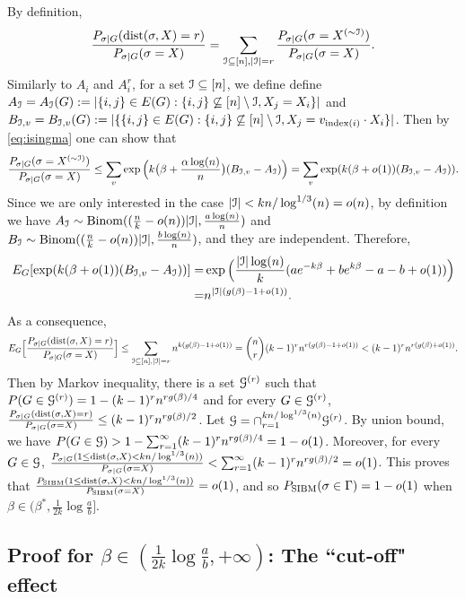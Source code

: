 \documentclass{article}
\begin{document}
By definition,
$$
\frac{P_{\sigma|G} ( \operatorname{dist}(\sigma, X) = r )}{P_{\sigma|G}(\sigma= X)}
=\sum_{\mathcal{I}\subseteq[n],|\mathcal{I}|=r} \frac{P_{\sigma|G} ( \sigma= X^{(\sim \mathcal{I})} )} {P_{\sigma|G}(\sigma= X)} .
$$
Similarly to $A_i$ and $A^r_i$, for a set $\mathcal{I}\subseteq[n]$, we define
define
$A_{\mathcal{I}}=A_{\mathcal{I}}(G):=|\{i,j\}\in E(G):  \{i, j\} \not\subseteq [n]\setminus\mathcal{I}, X_j=X_i\}|$ and  
$B_{\mathcal{I},v}=B_{\mathcal{I},v}(G):=|\{\{i,j\}\in E(G): \{i, j\} \not\subseteq [n]\setminus\mathcal{I}, X_j= v_{\mathrm{index}(i)} \cdot X_i\}|$.
Then by \eqref{eq:isingma} one can show that
$$
 \frac{P_{\sigma|G}(\sigma=X^{(\sim\mathcal{I})})}{P_{\sigma|G}(\sigma=X)} 
\le \sum_{v}\exp\Big( k\big(\beta+\frac{\alpha\log(n)}{n} \big) (B_{\mathcal{I},v}-A_{\mathcal{I}})
\Big) = \sum_{v}\exp ( k (\beta + o(1)) (B_{\mathcal{I},v}-A_{\mathcal{I}})
 ) .
$$
Since we are only interested in the case $|\mathcal{I}|<kn/\log^{1/3}(n)=o(n)$,
by definition we have $A_{\mathcal{I}}\sim\operatorname{Binom}((\frac{n}{k}-o(n))|\mathcal{I}|,\frac{a\log(n)}{n})$ and $B_{\mathcal{I}}\sim\operatorname{Binom}((\frac{n}{k}-o(n))|\mathcal{I}|,\frac{b\log(n)}{n})$, and they are independent. Therefore,
\begin{align*}
E_G[\exp ( k (\beta +o(1)) (B_{\mathcal{I},v}-A_{\mathcal{I}}) ) ] = &
\exp\Big(\frac{|\mathcal{I}|\log(n)}{k} ( a e^{-k\beta}+b e^{k\beta} -a-b +o(1) )
 \Big) \\
 = & n^{|\mathcal{I}|(g(\beta)-1+o(1))} .
\end{align*}
As a consequence,
\begin{equation} \label{eq:nn}
E_G \Big[ \frac{P_{\sigma|G} ( \operatorname{dist}(\sigma, X) = r)}{P_{\sigma|G}(\sigma= X)} \Big]
\le \sum_{\mathcal{I}\subseteq[n],|\mathcal{I}|=r} 
n^{k (g(\beta)-1+o(1))}
= \binom{n}{r} (k-1)^r n^{r (g(\beta)-1+o(1))}
< (k-1)^rn^{r (g(\beta)+o(1))} .
\end{equation}
Then by Markov inequality, there is a set $\mathcal{G}^{(r)}$ such that $P(G\in\mathcal{G}^{(r)})=1-(k-1)^rn^{r g(\beta)/4}$ and for every $G\in\mathcal{G}^{(r)}$,
$\frac{P_{\sigma|G} ( \operatorname{dist}(\sigma, X) = r )}{P_{\sigma|G}(\sigma= X)} \le (k-1)^rn^{r g(\beta)/2}$.
Let $\mathcal{G}=\cap_{r=1}^{kn/\log^{1/3}(n)} \mathcal{G}^{(r)}$. By union bound, we have $P(G\in\mathcal{G})>1-\sum_{r=1}^\infty (k-1)^rn^{r g(\beta)/4} = 1-o(1)$. Moreover, for every $G\in\mathcal{G}$,
$\frac{P_{\sigma|G} ( 1\le \operatorname{dist}(\sigma, X)< kn/\log^{1/3}(n) )}{P_{\sigma|G}(\sigma= X)} < \sum_{r=1}^\infty (k-1)^rn^{r g(\beta)/2} = o(1)$.
This proves that $\frac{P_{\operatorname{SIBM}} ( 1\le \operatorname{dist}(\sigma, X)< kn/\log^{1/3}(n) )}{P_{\operatorname{SIBM}}(\sigma= X)}=o(1)$, and so $P_{\operatorname{SIBM}}(\sigma \in \Gamma)=1-o(1)$ when $\beta\in(\beta^\ast,\frac{1}{2k}\log\frac{a}{b}]$.


\subsection{Proof for $\beta\in(\frac{1}{2k}\log\frac{a}{b},+\infty)$: The ``cut-off" effect}
\end{document}
